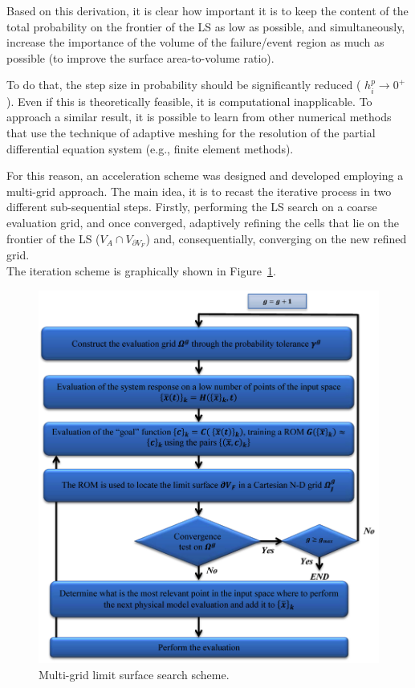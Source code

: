 Based on this derivation, it is clear how important it is to keep the
content of the total probability on the frontier of the LS as low as
possible, and simultaneously, increase the importance of the volume of
the failure/event region as much as possible (to improve the surface
area-to-volume ratio).

To do that, the step size in probability should be significantly
reduced ( $h_{i}^{p} \rightarrow 0^{+}$). Even if this is theoretically
feasible, it is computational inapplicable. To approach a similar result, it
is possible to learn from other numerical methods that use the
technique of adaptive meshing for the resolution of the partial
differential equation system (e.g., finite element methods).

For this reason, an acceleration scheme was designed and developed
employing a multi-grid approach. The main idea, it is to recast the
iterative process in two different sub-sequential steps. Firstly,
performing the LS search on a coarse evaluation grid, and once
converged, adaptively refining the cells that lie on the frontier of the LS
($V_{A} \cap V_{\partial V_{F}}$) and, consequentially, converging on
the new refined grid.
\\The iteration scheme is graphically shown in
Figure~\ref{fig:LimitSurfaceMultiGridAlgoFlow}.
\begin{figure}[h!]
  \centering
  \includegraphics[width=1.0\textwidth]  {pics/LimitSurfaceMultiGridAlgoFlow.png}
  \caption{Multi-grid limit surface search scheme.}
  \label{fig:LimitSurfaceMultiGridAlgoFlow}
\end{figure}
